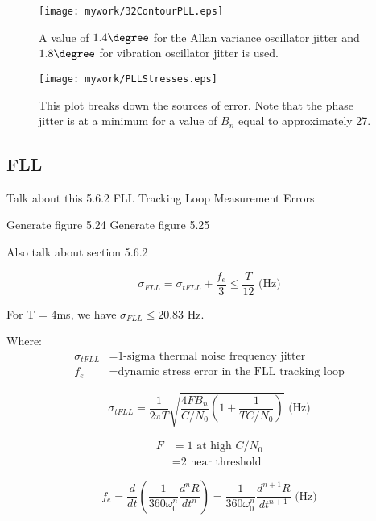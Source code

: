 \begin{figure}[!htb] 
    \centering
    \texttt{[image: mywork/32ContourPLL.eps]} 
    \caption{A value of $1.4\degree$ for the Allan variance oscillator jitter and $1.8\degree$ for vibration oscillator jitter is used.}
\end{figure}


\begin{figure}[!htb] 
    \centering
    \texttt{[image: mywork/PLLStresses.eps]} 
    \caption{This plot breaks down the sources of error. Note that the phase jitter is at a minimum for a value of $B_n$ equal to approximately 27.}
\end{figure}





\subsection{FLL}


Talk about this
5.6.2 FLL Tracking Loop Measurement Errors

Generate figure 5.24
Generate figure 5.25

Also talk about section 5.6.2

\begin{equation}
\sigma_{FLL} =  \sigma_{tFLL} + \frac{f_e}{3} \leq \frac{T}{12} \text{ (Hz)}
\end{equation}

For T = 4ms, we have $\sigma_{FLL} \leq 20.83$ Hz.


Where:
\begin{align*}
\sigma_{tFLL} &= \text{1-sigma thermal noise frequency jitter}\\
f_e &= \text{dynamic stress error in the FLL tracking loop}
\end{align*}


\begin{equation}
\sigma_{tFLL} = \frac{1}{2 \pi T} \sqrt{ \frac{4FB_n}{C/N_0}(1 + \frac{1}{TC/N_0})} \text{ (Hz)}
\end{equation}

\begin{align*}
F &= \text{1 at high } C/N_0\\
  &= \text{2 near threshold}
\end{align*}


\begin{equation}
f_e = \frac{d}{dt}(\frac{1}{360 \omega^n_0}\frac{d^nR}{dt^n}) = \frac{1}{360\omega^n_0} \frac{d^{n+1}R}{dt^{n+1}} \text{ (Hz)}
\end{equation}


